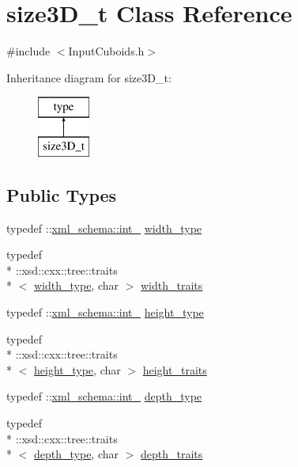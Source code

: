 \hypertarget{classsize3D__t}{\section{size3\-D\-\_\-t Class Reference}
\label{classsize3D__t}
}


{\ttfamily \#include $<$Input\-Cuboids.\-h$>$}

Inheritance diagram for size3\-D\-\_\-t\-:\begin{figure}[H]
\begin{center}
\leavevmode
\includegraphics[height=2.000000cm]{classsize3D__t}
\end{center}
\end{figure}
\subsection*{Public Types}
\begin{DoxyCompactItemize}
\item 
typedef \-::\hyperlink{namespacexml__schema_acfa24ac68e1a188e7f44c36f7a158bf4}{xml\-\_\-schema\-::int\-\_\-} \hyperlink{classsize3D__t_a7d35a723ccd7d990ae9b91f8d8856a69}{width\-\_\-type}
\item 
typedef \\*
\-::xsd\-::cxx\-::tree\-::traits\\*
$<$ \hyperlink{classsize3D__t_a7d35a723ccd7d990ae9b91f8d8856a69}{width\-\_\-type}, char $>$ \hyperlink{classsize3D__t_a98b58b7e1830b6e07c64d7a6dd10aae5}{width\-\_\-traits}
\item 
typedef \-::\hyperlink{namespacexml__schema_acfa24ac68e1a188e7f44c36f7a158bf4}{xml\-\_\-schema\-::int\-\_\-} \hyperlink{classsize3D__t_adc8341bc222084318ef434ea22833f69}{height\-\_\-type}
\item 
typedef \\*
\-::xsd\-::cxx\-::tree\-::traits\\*
$<$ \hyperlink{classsize3D__t_adc8341bc222084318ef434ea22833f69}{height\-\_\-type}, char $>$ \hyperlink{classsize3D__t_a915f1e11ad383a66bf5263c0f71c1b45}{height\-\_\-traits}
\item 
typedef \-::\hyperlink{namespacexml__schema_acfa24ac68e1a188e7f44c36f7a158bf4}{xml\-\_\-schema\-::int\-\_\-} \hyperlink{classsize3D__t_acc72088c95989e8ecee3fef8118cb91e}{depth\-\_\-type}
\item 
typedef \\*
\-::xsd\-::cxx\-::tree\-::traits\\*
$<$ \hyperlink{classsize3D__t_acc72088c95989e8ecee3fef8118cb91e}{depth\-\_\-type}, char $>$ \hyperlink{classsize3D__t_a0d246a6f5c4afb7d912244a5226f01a0}{depth\-\_\-traits}
\end{DoxyCompactItemize}
